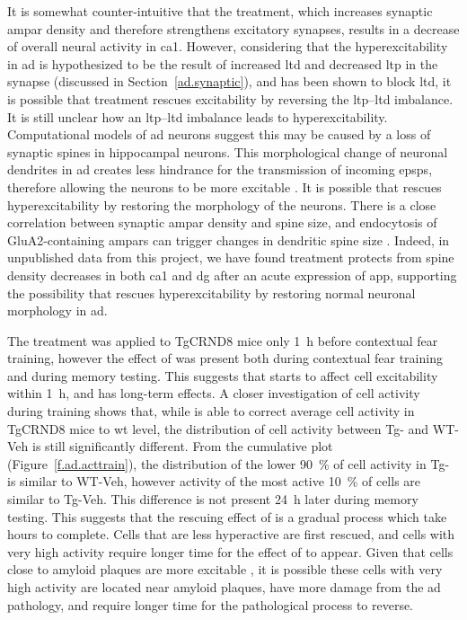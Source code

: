 It is somewhat counter-intuitive that the \tglu{} treatment, which increases synaptic \gls{ampar} density and therefore strengthens excitatory synapses, results in a decrease of overall neural activity in \gls{ca1}. However, considering that the hyperexcitability in \gls{ad} is hypothesized to be the result of increased \gls{ltd} and decreased \gls{ltp} in the synapse (discussed in Section~\ref{ad.synaptic}), and \tglu{} has been shown to block \gls{ltd}, it is possible that \tglu{} treatment rescues excitability by reversing the \gls{ltp}--\gls{ltd} imbalance. It is still unclear how an \gls{ltp}--\gls{ltd} imbalance leads to hyperexcitability. Computational models of \gls{ad} neurons suggest this may be caused by a loss of synaptic spines in hippocampal neurons. This morphological change of neuronal dendrites in \gls{ad} creates less hindrance for the transmission of incoming \glspl{epsp}, therefore allowing the neurons to be more excitable \citep{siskova14}. It is possible that \tglu{} rescues hyperexcitability by restoring the morphology of the neurons. There is a close correlation between synaptic \gls{ampar} density and spine size, and endocytosis of GluA2-containing \glspl{ampar} can trigger changes in dendritic spine size \citep{hanley08}. Indeed, in unpublished data from this project, we have found \tglu{} treatment protects from spine density decreases in both \gls{ca1} and \gls{dg} after an acute expression of \gls{app}, supporting the possibility that \tglu{} rescues hyperexcitability by restoring normal neuronal morphology in \gls{ad}. 

The \tglu{} treatment was applied to TgCRND8 mice only \SI{1}{\hour} before contextual fear training, however the effect of \tglu{} was present both during contextual fear training and during memory testing. This suggests that \tglu{} starts to affect cell excitability within \SI{1}{\hour}, and has long-term effects. A closer investigation of cell activity during training shows that, while \tglu{} is able to correct average cell activity in TgCRND8 mice to \gls{wt} level, the distribution of cell activity between Tg-\tglu{} and WT-Veh is still significantly different. From the cumulative plot (Figure~\ref{f.ad.acttrain}), the distribution of the lower \SI{90}{\percent} of cell activity in Tg-\tglu{} is similar to WT-Veh, however activity of the most active \SI{10}{\percent} of cells are similar to Tg-Veh. This difference is not present \SI{24}{\hour} later during memory testing. This suggests that the rescuing effect of \tglu{} is a gradual process which take hours to complete. Cells that are less hyperactive are first rescued, and cells with very high activity require longer time for the effect of \tglu{} to appear. Given that cells close to amyloid plaques are more excitable \citep{busche12}, it is possible these cells with very high activity are located near amyloid plaques, have more damage from the \gls{ad} pathology, and require longer time for the pathological process to reverse. 


